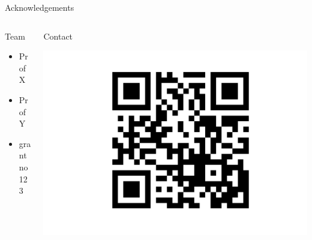 \documentclass[ignorenonframetext,]{beamer}
\begin{document}
\begin{frame}{Acknowledgements}
\protect\hypertarget{acknowledgements}{}
\begin{columns}[T]
\begin{column}{0.5\textwidth}
\begin{block}{Team}
\protect\hypertarget{team}{}
\begin{itemize}
\item
  Prof X
\item
  Prof Y
\item
  grant no 123
\end{itemize}
\end{block}
\end{column}

\begin{column}{0.5\textwidth}
\begin{block}{Contact}
\protect\hypertarget{contact}{}
\begin{center}\includegraphics[width=0.8\linewidth]{../graphs/qr-twitter-1} \end{center}
\end{block}
\end{column}
\end{columns}
\end{frame}
\end{document}

